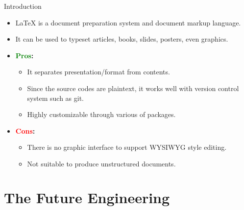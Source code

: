 \documentclass[xcolor={dvipsnames},aspectratio=169,10pt]{beamer}
\begin{document}
\begin{frame}{Introduction}
  \begin{itemize}
    \item \alert{\LaTeX{}} is a document preparation system and document markup language.
    \item It can be used to typeset articles, books, slides, posters, even graphics.
    \item \textbf{\textcolor{Green}{Pros}:}
          \begin{itemize}
            \item It separates presentation/format from contents.
            \item Since the source codes are plaintext, it works well with version control system such as git.
            \item Highly customizable through various of packages.
          \end{itemize}
    \item \textbf{\textcolor{Red}{Cons}:}
          \begin{itemize}
            \item There is no graphic interface to support WYSIWYG style editing.
            \item Not suitable to produce unstructured documents.
          \end{itemize}
  \end{itemize}
\end{frame}




\section{The Future Engineering }
\end{document}
